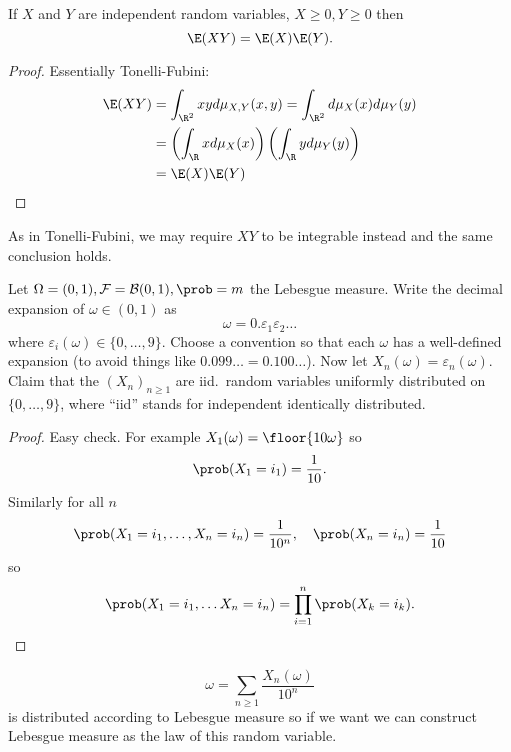 \documentclass[a4paper]{article}
\renewcommand{\P}{\prob} %
\begin{document}
\begin{proposition}
  If \(X\) and \(Y\) are independent random variables, \(X \geq 0, Y \geq 0\) then
  \[
    \E(XY) = \E(X) \E(Y).
  \]
\end{proposition}

\begin{proof}
  Essentially Tonelli-Fubini:
  \begin{align*}
    \E(XY) &= \int_{\R^2} xy d\mu_{X, Y} (x, y) = \int_{\R^2} d \mu_X(x) d \mu_Y(y) \\
           &= \left(\int_\R x d \mu_X(x) \right) \left(\int_\R y d \mu_Y(y) \right) \\
           &= \E(X) \E(Y)
  \end{align*}
\end{proof}

\begin{remark}
  As in Tonelli-Fubini, we may require \(XY\) to be integrable instead and the same conclusion holds.
\end{remark}

\begin{eg}
  Let \(\Omega = (0, 1), \mathcal F = \mathcal B(0, 1), \P = m\) the Lebesgue measure. Write the decimal expansion of \(\omega \in (0, 1)\) as
  \[
    \omega = 0. \varepsilon_1 \varepsilon_2 \dots
  \]
  where \(\varepsilon_i(\omega) \in \{0, \dots, 9\}\). Choose a convention so that each \(\omega\) has a well-defined expansion (to avoid things like \(0.099 \dots = 0.100\dots\)). Now let \(X_n(\omega) = \varepsilon_n(\omega)\). Claim that the \((X_n)_{n \geq 1}\) are iid.\ random variables uniformly distributed on \(\{0, \dots, 9\}\), where ``iid'' stands for independent identically distributed.

  \begin{proof}
    Easy check. For example \(X_1(\omega) = \floor{10 \omega}\) so
    \[
      \P(X_1 = i_1) = \frac{1}{10}.
    \]
    Similarly for all \(n\)
    \[
      \P(X_1 = i_1, \dots, X_n = i_n) = \frac{1}{10^n}, \quad \P(X_n = i_n) = \frac{1}{10}
    \]
    so
    \[
      \P(X_1 = i_1, \dots X_n = i_n) = \prod_{i = 1}^n \P(X_k = i_k).
    \]
  \end{proof}
\end{eg}

\begin{remark}
  \[
    \omega = \sum_{n \geq 1} \frac{X_n(\omega)}{10^n}
  \]
  is distributed according to Lebesgue measure so if we want we can construct Lebesgue measure as the law of this random variable.
\end{remark}
\end{document}
